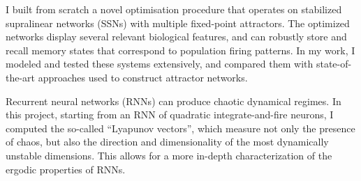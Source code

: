 \documentclass{muratcan_cv}
\begin{document}
{{%
 \begin{explanationitems}
    \item I built from scratch a novel optimisation procedure that operates on stabilized supralinear networks (SSNs) with multiple fixed-point attractors. The optimized networks display several relevant biological features, and can robustly store and recall memory states that correspond to population firing patterns. In my work, I modeled and tested these systems extensively, and compared them with state-of-the-art approaches used to construct attractor networks.
\end{explanationitems}
%
 \begin{explanationitems}
    \item Recurrent neural networks (RNNs) can produce chaotic dynamical regimes. In this project,
starting from an RNN of quadratic integrate-and-fire neurons, I computed the so-called ``Lyapunov vectors'', which measure not only the presence of chaos, but also the direction and dimensionality of the most dynamically unstable dimensions. This allows for a more in-depth characterization of the ergodic properties of RNNs.
\end{explanationitems}
 }

}
\end{document}
